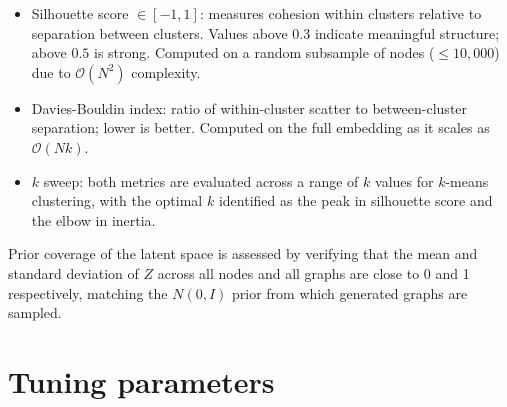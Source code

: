 \documentclass[11pt]{article}
\begin{document}
\begin{itemize}
\item Silhouette score $\in [-1, 1]$: measures cohesion within
  clusters relative to separation between clusters. Values above
  $0.3$ indicate meaningful structure; above $0.5$ is strong. Computed
  on a random subsample of nodes ($\leq 10,000$) due to
  $\mathcal{O}(N^2)$ complexity.
\item Davies-Bouldin index: ratio of within-cluster scatter to
  between-cluster separation; lower is better. Computed on the
  full embedding as it scales as $\mathcal{O}(N k)$.
\item $k$ sweep: both metrics are evaluated across a range of $k$
  values for $k$-means clustering, with the optimal $k$ identified as
  the peak in silhouette score and the elbow in inertia.
\end{itemize}
  

Prior coverage of the latent space is assessed by verifying that the
mean and standard deviation of $Z$ across all nodes and all graphs are
close to 0 and 1 respectively, matching the $N(0, I)$ prior from which
generated graphs are sampled.



\section{Tuning parameters}
\end{document}
